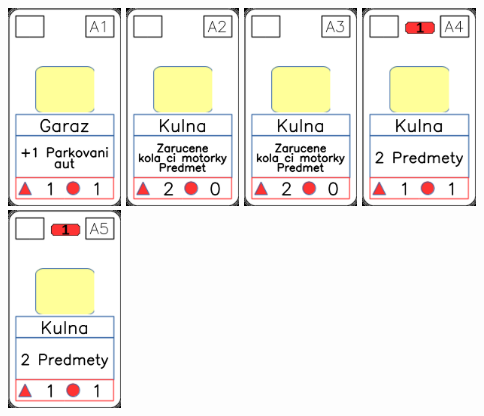\documentclass[a4paper]{article}
\begin{document}
	\includegraphics[width=3.0cm]{img-2_15}
	\includegraphics[width=3.0cm]{img-2_16}
	\includegraphics[width=3.0cm]{img-2_17}
	\includegraphics[width=3.0cm]{img-2_18}
	\includegraphics[width=3.0cm]{img-2_19}
\end{document}

